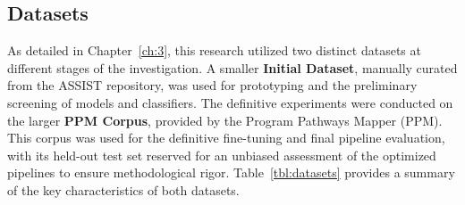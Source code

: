 \subsection{Datasets}\label{ch:4.1.2}
As detailed in Chapter~\ref{ch:3}, this research utilized two distinct datasets at different stages of the investigation. A smaller \textbf{Initial Dataset}, manually curated from the ASSIST repository, was used for prototyping and the preliminary screening of models and classifiers. The definitive experiments were conducted on the larger \textbf{PPM Corpus}, provided by the Program Pathways Mapper (PPM). This corpus was used for the definitive fine-tuning and final pipeline evaluation, with its held-out test set reserved for an unbiased assessment of the optimized pipelines to ensure methodological rigor. Table~\ref{tbl:datasets} provides a summary of the key characteristics of both datasets.

\begin{table}[!htbp]
    \captionsetup{skip=5pt}
    \centering
    \caption{Summary of Datasets Used in Evaluation}
    \label{tbl:datasets}
\end{table}

